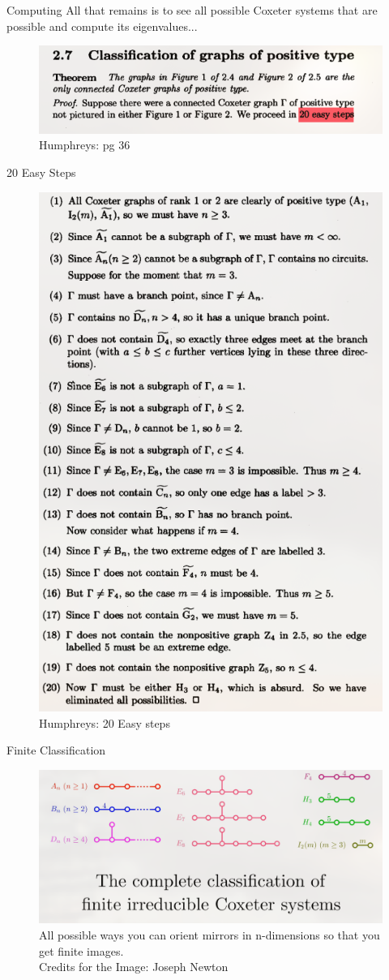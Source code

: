 \documentclass[aspectratio=169,xcolor=dvipsnames]{beamer}
\begin{document}
\begin{frame}{Computing}
    All that remains is to see all possible Coxeter systems that are possible and compute its eigenvalues...
    \begin{figure}
        \centering
        \includegraphics[width=0.5\linewidth]{HumphreysTheorem1.png}
        \caption{Humphreys: pg 36}
        \label{fig:enter-label}
    \end{figure}
\end{frame}

\begin{frame}{20 Easy Steps}
   \begin{figure}
       \centering
       \includegraphics[width=0.32\linewidth]{20EasySteps.png}
       \caption{Humphreys: 20 Easy steps}
       \label{fig:enter-label}
   \end{figure}
\end{frame}

\begin{frame}{Finite Classification}
    \begin{figure}
        \centering
        \includegraphics[width=1\linewidth]{FiniteClassification.png}
        \caption{All possible ways you can orient mirrors in n-dimensions so that you get finite images.\\Credits for the Image: Joseph Newton}
        \label{fig:enter-label}
    \end{figure}
\end{frame}
\end{document}
